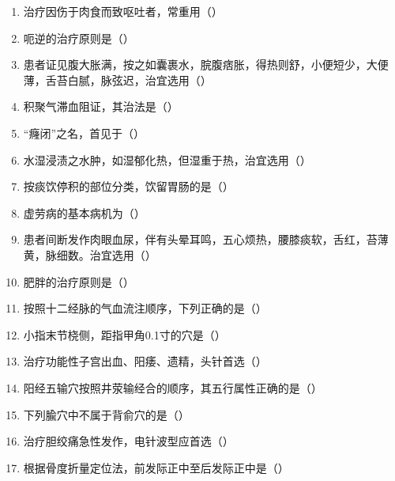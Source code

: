\documentclass[a4paper,11pt]{ctexart}
\begin{document}
\begin{enumerate}
      \item 治疗因伤于肉食而致呕吐者，常重用（\quad）
      \item 呃逆的治疗原则是（\quad）
      \item 患者证见腹大胀满，按之如囊裹水，脘腹痞胀，得热则舒，小便短少，大便薄，舌苔白腻，脉弦迟，治宜选用（\quad）
      \item 积聚气滞血阻证，其治法是（\quad）
      \item “癃闭”之名，首见于（\quad）
      \item 水湿浸渍之水肿，如湿郁化热，但湿重于热，治宜选用（\quad）
      \item 按痰饮停积的部位分类，饮留胃肠的是（\quad）
      \item 虚劳病的基本病机为（\quad）
      \item 患者间断发作肉眼血尿，伴有头晕耳鸣，五心烦热，腰膝痰软，舌红，苔薄黄，脉细数。治宜选用（\quad）
      \item 肥胖的治疗原则是（\quad）
      \item 按照十二经脉的气血流注顺序，下列正确的是（\quad）
      \item 小指末节桡侧，距指甲角0.1寸的穴是（\quad）
      \item 治疗功能性子宫出血、阳痿、遗精，头针首选（\quad）
      \item 阳经五输穴按照井荥输经合的顺序，其五行属性正确的是（\quad）
      \item 下列腧穴中不属于背俞穴的是（\quad）
      \item 治疗胆绞痛急性发作，电针波型应首选（\quad）
      \item 根据骨度折量定位法，前发际正中至后发际正中是（\quad）
\end{enumerate}
\end{document}

